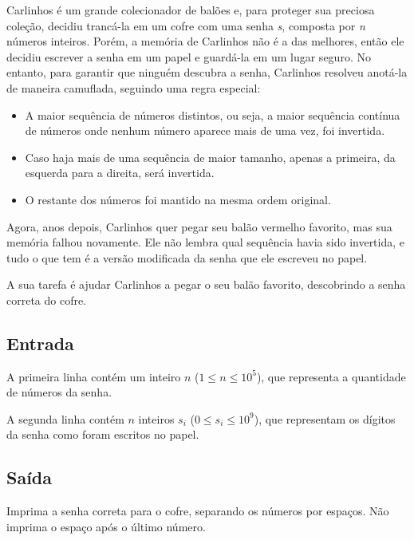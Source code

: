 Carlinhos é um grande colecionador de balões e, para proteger sua preciosa coleção, decidiu trancá-la em um cofre com uma senha \textit{s}, composta por \textit{n} números inteiros.
Porém, a memória de Carlinhos não é a das melhores, então ele decidiu escrever a senha em um papel e guardá-la em um lugar seguro.
No entanto, para garantir que ninguém descubra a senha, Carlinhos resolveu anotá-la de maneira camuflada, seguindo uma regra especial:

\begin{itemize}
    \item A maior sequência de números distintos, ou seja, a maior sequência contínua de números onde nenhum número aparece mais de uma vez, foi invertida.
    \item Caso haja mais de uma sequência de maior tamanho, apenas a primeira, da esquerda para a direita, será invertida.
    \item O restante dos números foi mantido na mesma ordem original.
\end{itemize}

Agora, anos depois, Carlinhos quer pegar seu balão vermelho favorito, mas sua memória falhou novamente. 
Ele não lembra qual sequência havia sido invertida, e tudo o que tem é a versão modificada da senha que ele escreveu no papel.

A sua tarefa é ajudar Carlinhos a pegar o seu balão favorito, descobrindo a senha correta do cofre.

\subsection*{Entrada}

A primeira linha contém um inteiro $n$ ($1 \leq n \leq 10^5$), que representa a quantidade de números da senha.

A segunda linha contém $n$ inteiros $s_i$ ($0 \leq s_i \leq 10^9$), que representam os dígitos da senha como foram escritos no papel.

\subsection*{Saída}

Imprima a senha correta para o cofre, separando os números por espaços. Não imprima o espaço após o último número.

